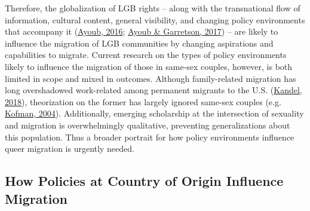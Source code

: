 \documentclass[
  12pt,
]{article}
\begin{document}
Therefore, the globalization of LGB rights -- along with the transnational flow of information, cultural content, general visibility, and changing policy environments that accompany it (\protect\hyperlink{ref-ayoub_2016}{Ayoub, 2016}; \protect\hyperlink{ref-ayoub_2017}{Ayoub \& Garretson, 2017}) -- are likely to influence the migration of LGB communities by changing aspirations and capabilities to migrate. Current research on the types of policy environments likely to influence the migration of those in same-sex couples, however, is both limited in scope and mixed in outcomes. Although family-related migration has long overshadowed work-related among permanent migrants to the U.S. (\protect\hyperlink{ref-kandel_2018_familybased}{Kandel, 2018}), theorization on the former has largely ignored same-sex couples (e.g. \protect\hyperlink{ref-kofman_2004_family}{Kofman, 2004}). Additionally, emerging scholarship at the intersection of sexuality and migration is overwhelmingly qualitative, preventing generalizations about this population. Thus a broader portrait for how policy environments influence queer migration is urgently needed.\\

\hypertarget{how-policies-at-country-of-origin-influence-migration}{%
\subsection{How Policies at Country of Origin Influence Migration}\label{how-policies-at-country-of-origin-influence-migration}}
\end{document}
